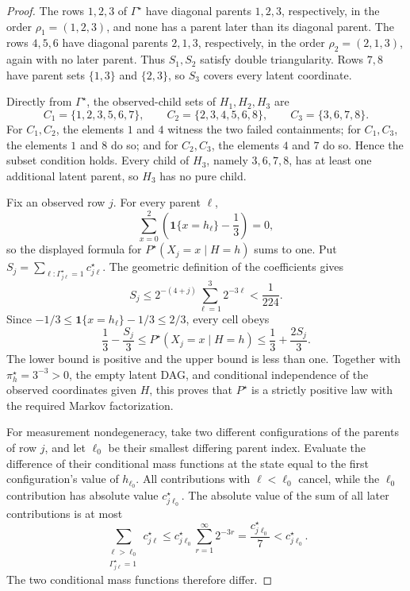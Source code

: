 \documentclass{article}
\begin{document}
\begin{proof}
The rows \(1,2,3\) of \(\Gamma^{\star}\) have diagonal parents \(1,2,3\), respectively, in the order \(\rho_1=(1,2,3)\), and none has a parent later than its diagonal parent.  The rows \(4,5,6\) have diagonal parents \(2,1,3\), respectively, in the order \(\rho_2=(2,1,3)\), again with no later parent.  Thus \(S_1,S_2\) satisfy double triangularity.  Rows \(7,8\) have parent sets \(\{1,3\}\) and \(\{2,3\}\), so \(S_3\) covers every latent coordinate.

Directly from \(\Gamma^{\star}\), the observed-child sets of \(H_1,H_2,H_3\) are
\[
 C_1=\{1,2,3,5,6,7\},\qquad
 C_2=\{2,3,4,5,6,8\},\qquad
 C_3=\{3,6,7,8\}.
\]
For \(C_1,C_2\), the elements \(1\) and \(4\) witness the two failed containments; for \(C_1,C_3\), the elements \(1\) and \(8\) do so; and for \(C_2,C_3\), the elements \(4\) and \(7\) do so.  Hence the subset condition holds.  Every child of \(H_3\), namely \(3,6,7,8\), has at least one additional latent parent, so \(H_3\) has no pure child.

Fix an observed row \(j\).  For every parent \(\ell\),
\[
 \sum_{x=0}^2\left(\mathbf 1\{x=h_\ell\}-\frac13\right)=0,
\]
so the displayed formula for \(P^{\star}(X_j=x\mid H=h)\) sums to one.  Put
\(S_j=\sum_{\ell:\Gamma^{\star}_{j\ell}=1}c^{\star}_{j\ell}\).  The geometric definition of the coefficients gives
\[
 S_j\le 2^{-(4+j)}\sum_{\ell=1}^3 2^{-3\ell}<\frac1{224}.
\]
Since \(-1/3\le \mathbf 1\{x=h_\ell\}-1/3\le2/3\), every cell obeys
\[
 \frac13-\frac{S_j}{3}
 \le P^{\star}(X_j=x\mid H=h)
 \le\frac13+\frac{2S_j}{3}.
\]
The lower bound is positive and the upper bound is less than one.  Together with \(\pi_h^{\star}=3^{-3}>0\), the empty latent DAG, and conditional independence of the observed coordinates given \(H\), this proves that \(P^{\star}\) is a strictly positive law with the required Markov factorization.

For measurement nondegeneracy, take two different configurations of the parents of row \(j\), and let \(\ell_0\) be their smallest differing parent index.  Evaluate the difference of their conditional mass functions at the state equal to the first configuration's value of \(h_{\ell_0}\).  All contributions with \(\ell<\ell_0\) cancel, while the \(\ell_0\) contribution has absolute value \(c^{\star}_{j\ell_0}\).  The absolute value of the sum of all later contributions is at most
\[
 \sum_{\substack{\ell>\ell_0\\\Gamma^{\star}_{j\ell}=1}}c^{\star}_{j\ell}
 \le c^{\star}_{j\ell_0}\sum_{r=1}^{\infty}2^{-3r}
 =\frac{c^{\star}_{j\ell_0}}7
 <c^{\star}_{j\ell_0}.
\]
The two conditional mass functions therefore differ.


\end{proof}
\end{document}
